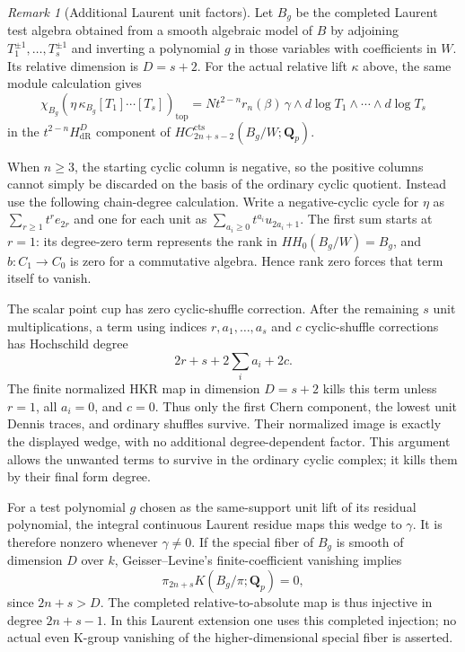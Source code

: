 \documentclass[11pt,a4paper]{article}
\theoremstyle{remark}
\newtheorem{remark}[theorem]{Remark}
\begin{document}
\begin{remark}[Additional Laurent unit factors]
Let $B_g$ be the completed Laurent test algebra obtained from a
smooth algebraic model of $B$ by adjoining
$T_1^{\pm1},\ldots,T_s^{\pm1}$ and inverting a polynomial $g$
in those variables with coefficients in $W$. Its relative
dimension is $D=s+2$. For the actual relative lift $\kappa$ above,
the same module calculation gives
\[
 \chi_{B_g}\!\left(\eta\,\kappa_{B_g}
                         [T_1]\cdots[T_s]\right)_{\mathrm{top}}
   =N t^{2-n}r_n(\beta)\,
           \gamma\wedge d\log T_1\wedge\cdots\wedge d\log T_s
\]
in the $t^{2-n}H^D_{\mathrm{dR}}$ component of
$HC_{2n+s-2}^{\mathrm{cts}}(B_g/W;\mathbf Q_p)$.

When $n\geq3$, the starting cyclic column is negative, so the
positive columns cannot simply be discarded on the basis of the
ordinary cyclic quotient. Instead use the following chain-degree
calculation. Write a negative-cyclic cycle for $\eta$ as
$\sum_{r\geq1}t^r e_{2r}$ and one for each unit as
$\sum_{a_i\geq0}t^{a_i}u_{2a_i+1}$.
The first sum starts at $r=1$: its degree-zero term represents the
rank in $HH_0(B_g/W)=B_g$, and $b:C_1\to C_0$ is zero for a
commutative algebra. Hence rank zero forces that term itself to
vanish.

The scalar point cup has zero cyclic-shuffle correction. After
the remaining $s$ unit multiplications, a term using indices
$r,a_1,\ldots,a_s$ and $c$ cyclic-shuffle corrections has
Hochschild degree
\[
                   2r+s+2\sum_i a_i+2c.
\]
The finite normalized HKR map in dimension $D=s+2$ kills this
term unless $r=1$, all $a_i=0$, and $c=0$. Thus only the first
Chern component, the lowest unit Dennis traces, and ordinary
shuffles survive. Their normalized image is exactly the
displayed wedge, with no additional degree-dependent factor.
This argument allows the unwanted terms to survive in the
ordinary cyclic complex; it kills them by their final form degree.

For a test polynomial $g$ chosen as the same-support unit lift of
its residual polynomial, the integral continuous Laurent residue
maps this wedge to $\gamma$. It is therefore nonzero whenever
$\gamma\ne0$. If the special fiber of $B_g$ is smooth of dimension
$D$ over $k$, Geisser--Levine's finite-coefficient vanishing
\cite[Theorem~8.4]{GeisserLevineCharP} implies
\[
 \pi_{2n+s}K(B_g/\pi;\mathbf Q_p)=0,
\]
since $2n+s>D$. The completed relative-to-absolute map is thus
injective in degree $2n+s-1$. In this Laurent extension one uses
this completed injection; no actual even K-group vanishing of
the higher-dimensional special fiber is asserted.
\end{remark}
\end{document}
